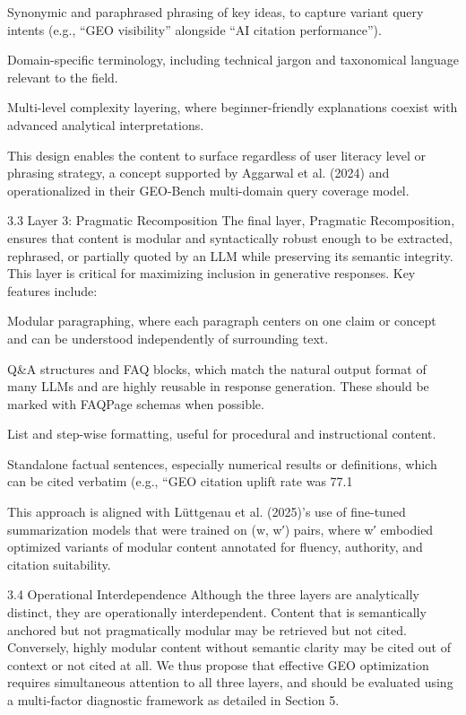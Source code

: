 Synonymic and paraphrased phrasing of key ideas, to capture variant query intents (e.g., “GEO visibility” alongside “AI citation performance”).

Domain-specific terminology, including technical jargon and taxonomical language relevant to the field.

Multi-level complexity layering, where beginner-friendly explanations coexist with advanced analytical interpretations.

This design enables the content to surface regardless of user literacy level or phrasing strategy, a concept supported by Aggarwal et al. (2024) and operationalized in their GEO-Bench multi-domain query coverage model.

3.3 Layer 3: Pragmatic Recomposition
The final layer, Pragmatic Recomposition, ensures that content is modular and syntactically robust enough to be extracted, rephrased, or partially quoted by an LLM while preserving its semantic integrity. This layer is critical for maximizing inclusion in generative responses. Key features include:

Modular paragraphing, where each paragraph centers on one claim or concept and can be understood independently of surrounding text.

Q&A structures and FAQ blocks, which match the natural output format of many LLMs and are highly reusable in response generation. These should be marked with FAQPage schemas when possible.

List and step-wise formatting, useful for procedural and instructional content.

Standalone factual sentences, especially numerical results or definitions, which can be cited verbatim (e.g., “GEO citation uplift rate was 77.1%

This approach is aligned with Lüttgenau et al. (2025)’s use of fine-tuned summarization models that were trained on (w, w′) pairs, where w′ embodied optimized variants of modular content annotated for fluency, authority, and citation suitability.

3.4 Operational Interdependence
Although the three layers are analytically distinct, they are operationally interdependent. Content that is semantically anchored but not pragmatically modular may be retrieved but not cited. Conversely, highly modular content without semantic clarity may be cited out of context or not cited at all. We thus propose that effective GEO optimization requires simultaneous attention to all three layers, and should be evaluated using a multi-factor diagnostic framework as detailed in Section 5.
